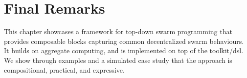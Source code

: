 %
%
%

\section{Final Remarks}
\label{coordination2023-macro:sec:conc}

This chapter showcases
 a framework 
 for top-down swarm programming
 that provides composable blocks 
 capturing common decentralized swarm behaviours.
%
It builds on aggregate computing,
 and is implemented on top of the \scafi{} toolkit/\ac{dsl}.
%
We show through examples and a simulated case study
 that the approach is compositional, practical, and expressive.
%
